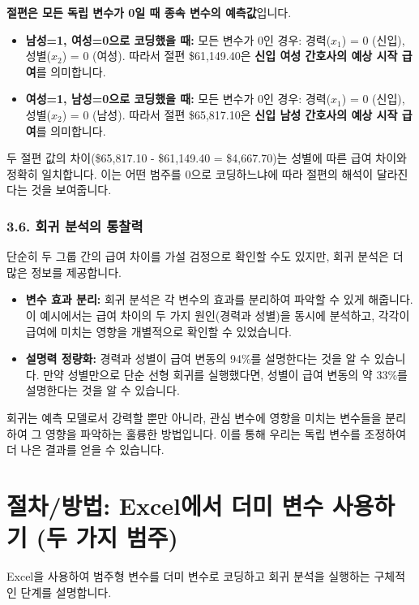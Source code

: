 \documentclass[11pt,a4paper]{article}
\begin{document}
\begin{tcolorbox}[title=절편(Intercept)의 의미 변화]
\textbf{절편은 모든 독립 변수가 0일 때 종속 변수의 예측값}입니다.
\begin{itemize}
    \item \textbf{남성=1, 여성=0으로 코딩했을 때:}
    모든 변수가 0인 경우: 경력($x_1$) = 0 (신입), 성별($x_2$) = 0 (여성).
    따라서 절편 \$61,149.40은 \textbf{신입 여성 간호사의 예상 시작 급여}를 의미합니다.
    \item \textbf{여성=1, 남성=0으로 코딩했을 때:}
    모든 변수가 0인 경우: 경력($x_1$) = 0 (신입), 성별($x_2$) = 0 (남성).
    따라서 절편 \$65,817.10은 \textbf{신입 남성 간호사의 예상 시작 급여}를 의미합니다.
\end{itemize}
두 절편 값의 차이(\$65,817.10 - \$61,149.40 = \$4,667.70)는 성별에 따른 급여 차이와 정확히 일치합니다. 이는 어떤 범주를 0으로 코딩하느냐에 따라 절편의 해석이 달라진다는 것을 보여줍니다.
\end{tcolorbox}

\subsubsection*{3.6. 회귀 분석의 통찰력}
단순히 두 그룹 간의 급여 차이를 가설 검정으로 확인할 수도 있지만, 회귀 분석은 더 많은 정보를 제공합니다.
\begin{itemize}
    \item \textbf{변수 효과 분리:} 회귀 분석은 각 변수의 효과를 분리하여 파악할 수 있게 해줍니다. 이 예시에서는 급여 차이의 두 가지 원인(경력과 성별)을 동시에 분석하고, 각각이 급여에 미치는 영향을 개별적으로 확인할 수 있었습니다.
    \item \textbf{설명력 정량화:} 경력과 성별이 급여 변동의 94\%를 설명한다는 것을 알 수 있습니다. 만약 성별만으로 단순 선형 회귀를 실행했다면, 성별이 급여 변동의 약 33\%를 설명한다는 것을 알 수 있습니다.
\end{itemize}
회귀는 예측 모델로서 강력할 뿐만 아니라, 관심 변수에 영향을 미치는 변수들을 분리하여 그 영향을 파악하는 훌륭한 방법입니다. 이를 통해 우리는 독립 변수를 조정하여 더 나은 결과를 얻을 수 있습니다.

\newpage
\section*{절차/방법: Excel에서 더미 변수 사용하기 (두 가지 범주)}
Excel을 사용하여 범주형 변수를 더미 변수로 코딩하고 회귀 분석을 실행하는 구체적인 단계를 설명합니다.
\end{document}
